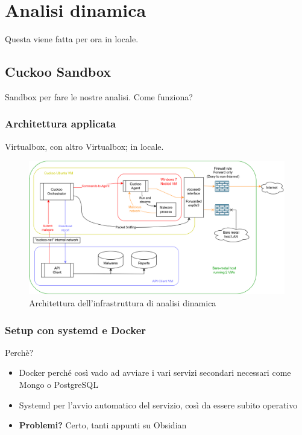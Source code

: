 \chapter{Analisi dinamica}

Questa viene fatta per ora in locale.

\section{Cuckoo Sandbox}
Sandbox per fare le nostre analisi.
Come funziona?

\subsection{Architettura applicata}
Virtualbox, con altro Virtualbox; in locale.

\begin{figure}[H]
    \centering
    \includegraphics[width=\textwidth]{assets/cuckoo_vms.png}
    \caption{Architettura dell'infrastruttura di analisi dinamica}
    \label{fig:cuckoo_vms_architecture}
\end{figure}

\subsection{Setup con systemd e Docker}
Perchè?
\begin{itemize}
    \item Docker perché così vado ad avviare i vari servizi secondari necessari come Mongo o PostgreSQL
    \item Systemd per l'avvio automatico del servizio, così da essere subito operativo
    \item \textbf{Problemi?} Certo, tanti appunti su Obsidian
\end{itemize}

